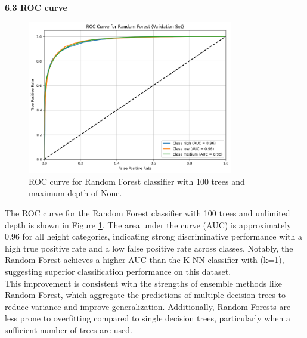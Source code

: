 \documentclass[12pt]{article}
\begin{document}
\vspace{20pt}

\textbf{6.3 ROC curve}
\\

\begin{figure}[H]
\centering
\includegraphics[width=0.8\textwidth]{figures/rf_roc_curve.png}
\caption{ROC curve for Random Forest classifier with 100 trees and maximum depth of None.}
\label{fig:rf_roc_curve}
\end{figure}

The ROC curve for the Random Forest classifier with 100 trees and unlimited depth is shown in Figure \ref{fig:rf_roc_curve}. The area under the curve (AUC) is approximately 0.96 for all height categories, indicating strong discriminative performance with a high true positive rate and a low false positive rate across classes. Notably, the Random Forest achieves a higher AUC than the K-NN classifier with (k=1), suggesting superior classification performance on this dataset. 
\\
This improvement is consistent with the strengths of ensemble methods like Random Forest, which aggregate the predictions of multiple decision trees to reduce variance and improve generalization. Additionally, Random Forests are less prone to overfitting compared to single decision trees, particularly when a sufficient number of trees are used.

\vspace{20pt}
\end{document}
